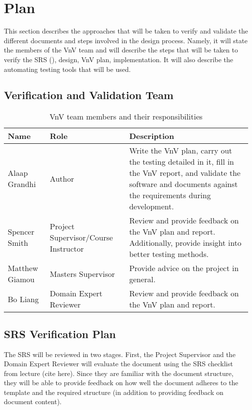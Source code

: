 \documentclass[12pt, titlepage]{article}
\begin{document}
\section{Plan}

This section describes the approaches that will be taken to verify and validate the different documents
and steps involved in the design process. Namely, it will state the members of the VnV team and will describe
the steps that will be taken to verify the SRS (\cite{SRS}), design, VnV plan, implementation. It will also describe the automating
testing tools that will be used.

\subsection{Verification and Validation Team}

\begin{table}[H]
  \centering
  \begin{tabular}{|p{3cm}|p{3cm}|p{6cm}|}
  \hline
  \textbf{Name} & \textbf{Role} & \textbf{Description} \\ \hline
  Alaap Grandhi & Author & Write the VnV plan, carry out the testing detailed in it, fill in the VnV report, and validate the software and documents against the requirements during development. \\ \hline
  Spencer Smith & Project Supervisor/Course Instructor & Review and provide feedback on the VnV plan and report. Additionally, provide insight into better testing methods. \\ \hline
  Matthew Giamou & Masters Supervisor & Provide advice on the project in general. \\ \hline
  Bo Liang & Domain Expert Reviewer & Review and provide feedback on the VnV plan and report. \\ \hline 
  \end{tabular}
  \caption{VnV team members and their responsibilities}
  \label{Table:VnV_Team}
\end{table}

\subsection{SRS Verification Plan}

The SRS will be reviewed in two stages. First, the Project Supervisor and the Domain
Expert Reviewer will evaluate the document using the SRS checklist from lecture (cite here).
Since they are familiar with the document structure, they will be able to provide feedback
on how well the document adheres to the template and the required structure (in addition to 
providing feedback on document content). 
\end{document}
